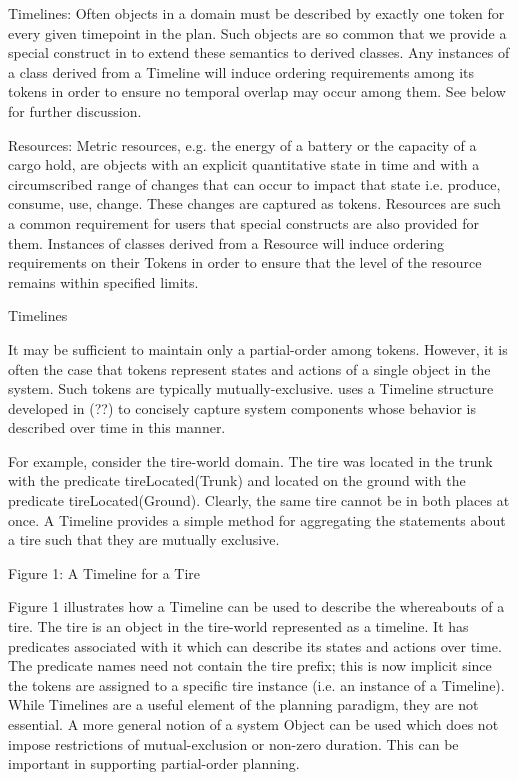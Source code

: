 Timelines: Often objects in a domain must be described by exactly one
token for every given timepoint in the plan. Such objects are so
common that we provide a special construct in \eu to extend these
semantics to derived classes. Any instances of a class derived from a
Timeline will induce ordering requirements among its tokens in order
to ensure no temporal overlap may occur among them. See below for
further discussion.

Resources: Metric resources, e.g. the energy of a battery or the
capacity of a cargo hold, are objects with an explicit quantitative
state in time and with a circumscribed range of changes that can occur
to impact that state i.e. produce, consume, use, change. These changes
are captured as tokens. Resources are such a common requirement for
\eu users that special constructs are also provided for
them. Instances of classes derived from a Resource will induce
ordering requirements on their Tokens in order to ensure that the
level of the resource remains within specified limits.

Timelines

It may be sufficient to maintain only a partial-order among
tokens. However, it is often the case that tokens represent states and
actions of a single object in the system. Such tokens are typically
mutually-exclusive. \eu uses a Timeline structure developed in (??)
to concisely capture system components whose behavior is described
over time in this manner.

 For example, consider the tire-world domain. The tire was
located in the trunk with the predicate tireLocated(Trunk) and located
on the ground with the predicate tireLocated(Ground). Clearly, the
same tire cannot be in both places at once. A Timeline provides a
simple method for aggregating the statements about a tire such that
they are mutually exclusive.

Figure 1: A Timeline for a Tire

Figure 1 illustrates how a Timeline can be used to describe the
whereabouts of a tire. The tire is an object in the tire-world
represented as a timeline. It has predicates associated with it which
can describe its states and actions over time. The predicate names
need not contain the tire prefix; this is now implicit since the
tokens are assigned to a specific tire instance (i.e. an instance of a
Timeline). While Timelines are a useful element of the \eu planning
paradigm, they are not essential. A more general notion of a system
Object can be used which does not impose restrictions of
mutual-exclusion or non-zero duration. This can be important in
supporting partial-order planning.

